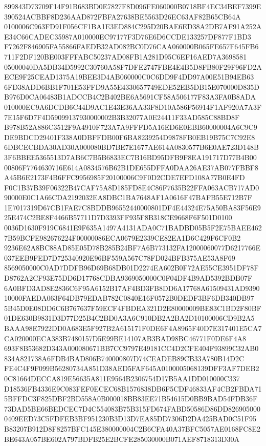 \documentclass[UTF8,fontset=fandol,zihao=-4,a4paper]{ctexart}
\begin{document}
{{899843D73709F14F91B683BD0E7827F8D096FE060000B0718BF4EC34BEF7399E390524ACBBF8D236AAD872FBFA27638BE5563D26EC63AF82B65CB64A
0100006C963FD91F056CF1BA1E3ED884C295D20BAE6ED38A2DB7AF91A252AE34C66CADEC35987A010000EC97177F3D76E6D6CCDE133257DF877F1BD3
F7262F846905FA55866FAEDB32AD082BC0D76CAA060000B065FE657F645FB6711F2DF120BE003FFFABC50237AD08FB1A281D95C6EF16AED7A3698581
05000040DA5DB34D5992C30760A58F7DFE2747FBE4E4B5D8FB80F29F96FD2AECE9F25CEAD1375A19BEE3D4AB060000C0C6DD9F4DD97A00E51B94EB63
6FD38ADD6BB1F701E53FFD9A55E4330657749EDE52EB5DB15E070000D835DB976D0CA06483B1ADCCB4C2B402BE6A5691CF58A506177F83A3FA0B8ADA
010000EC9A6DCDB6C44D9AC1E43E36AA33F8D10A586F56914F1AF920A7A3F7E15F6D7F4D59099137930000002B3B32077A0E24411F33AD585C88BD8F
B978B52A886C3512F9A4910F723A7A9FFFD5A16ED6E0EBB60000004A6C9C9DE9BDCD29401F338A0DBFFDB00F6BA8239254D9878FB0EB19B75C7C92E8
6DBCECBDA30AD30A000080BD7BE7E1677AE614A0830577B6E0AE723D148B3F6BBEE5365513D7AB6C7B5B6833EC7B16BD95DFB9F8EA191717D77B4B00
00806F7764630716E614A0834576B62B1DE655DFFA0DAA26AE37AB077FBBF8A45B6E2173F4B6FFC9956985F20100006C9F0D2CDE7EFD108A77B0E4FD
F0C1B37B39F06322B47CAF75A8D185FD8E4C86F7635B22FFA063ACB717AD090000E0C1A66CDA2192032EA8DBC1BA7648AF1A0616F47BAFB55E712B7F
1E7017319D67CB1FAE7C8BDDB96552440000801DF4E44324E75A50BA83F56E925E474C2BE8F4466B57711D7D3393FF935F8B318CE9668F6F501D0100
0036D1630F919C6841E9F635A1497A4131ADA0C71BADBD05B5F2E75BAEE4627B59BCFE982676224F00000086ECA0679E2339CE82EA1D6C429F6CF0B2
9236E62A8BC88AD85E05D78B285B24BF7A6B773132FA12000060077D6217766E037EEB9FED7D725340920E96BF559A567C78FD024BFB375AE53A8F69
8569050000C0AD7DDFB96D69B68DB01D2274EA602B0F72AE55CE3951DF78FD8762A2CF93E75DD6D17768CDBA9369050000C0F04DF4B9AD5392BDB07F
6A0BFD3AD8E2836C6F95A6152B17AF4BD3FB8DD6A17768A61509431AD939010000FAEDA063F64DB79EDAB782C0840E16F0572B0DEDF3BF6DB340DB97
5B45D0E08DD6C6B767637F59ECF4FBDEA321D2E80000009BE83C1BD2F80BF01DE630B9831D3D77D25B4C2BD0A3A6C910DB2A2BA2D10100006CD9B2A5
BAAA98E7922DD0A683E5F927B2A615171F0DE6F4A8965F40D7E317401E5CA7CA020000ECA383B7480157D5E99BE14107AB3BAD98BC46771F0DE6F4A8
693F8B53682D343A000080671BB7CC9797E49181CC4D2CFE404F93899C32AB0834A821738A6FDB4BAD806B740000807D74CEADEB89CB33A780B14D2C
FE4C4F9F099B56280734A851D38AED5FAF645A0100005068139DFF3AF7DEB20C81664DECCA819E56635A811E9564B2306754D17B5AA1DD010000C337
D18536FB4336E9C083FEF0ECEC68B1576838DB6F5CDF46833AF4CB2FBDA715BFFDC3F825DBF2BD558A0B000018BB83EE71B54615D0BB9BAD54FDB36F
73DAD5BE66BEDCEC7D4C554083B75B315FD674FABD50586D86DD8269050000409EED73C5FDFEB3BF951230B3D13D7EA85DD7306D2DA425BAD0C51F95
B83207B912D8F8257BFC145E380000004C2B6CFA40A37BFC5057AE0168FC8E2BE643A057BE602A797BDFB25E2BCFE285030000B071AEF8718313D30A
}}
\end{document}
